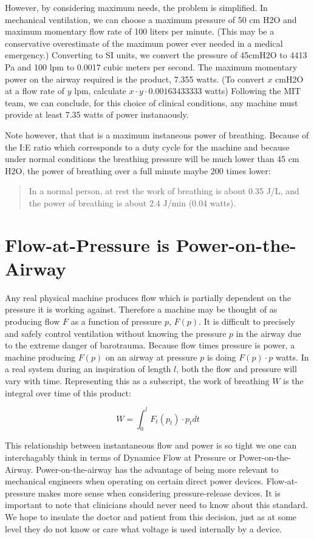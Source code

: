 \documentclass[conference]{article}
\begin{document}
However, by considering maximum needs, the problem is simplified. In mechanical ventilation,
we can choose a maximum pressure of 50 cm H2O and maximum momentary flow rate of 100 liters per minute.
(This may be a conservative overestimate of the maximum power ever needed in a medical emergency.)
Converting to SI units, we convert the pressure of 45cmH2O to 4413 Pa and 100 lpm to 0.0017 cubic meters per second.
The maximum momentary power on the airway required is the product, 7.355 watts.
(To convert $x$ cmH2O at a flow rate of $y$ lpm, calculate $x \cdot y \cdot 0.00163433333$ watts)
Following the MIT team, we can conclude, for this choice of clinical conditions, any
machine must provide at least 7.35 watts of power instanaously.

Note however, that that is a maximum instaneous power of breathing. Because of the I:E ratio which corresponds to a duty cycle for the machine
and because under normal
conditions the breathing pressure will be much lower than 45 cm H2O, the power of breathing over a full minute
maybe 200 times lower:
\begin{quote}
In a normal person, at rest the work of breathing is about 0.35 J/L, and the power of breathing is about 2.4 J/min (0.04 watts)\cite{mancebo1995comparative}.
\end{quote}

\section{Flow-at-Pressure is Power-on-the-Airway}

Any real physical machine produces flow which is partially dependent on the pressure it is working against.
Therefore a machine may be thought of as producing flow $F$ as a function of pressure $p$, $F(p)$.
It is difficult to precisely and safely control ventilation without knowing the
pressure $p$ in the airway  due to the extreme danger of barotrauma.
Because flow times pressure is power, a machine producing $F(p)$ on an airway at pressure $p$ is
doing $F(p) \cdot p$ watts. In a real system during an inspiration of length $l$, both the flow and pressure will
vary with time. Representing this as a subscript, the work of breathing $W$ is the integral over time
of this product:

\begin{equation}
  W = \int_{0}^{l} F_t(p_t)\cdot p_t dt
  \end{equation}

This relationship between instantaneous flow and power is so tight we one can interchagably think in terms of
Dynamice Flow at Pressure or Power-on-the-Airway.
Power-on-the-airway has the advantage of being
more relevant to mechanical engineers when operating on certain direct power devices.
Flow-at-pressure makes more sense when considering pressure-release devices.
It is important to note that clinicians
should never need to know about this standard. We hope to insulate the doctor and
patient from this decision, just as at some level they do not know or care what voltage
is used internally by a device.
\end{document}
